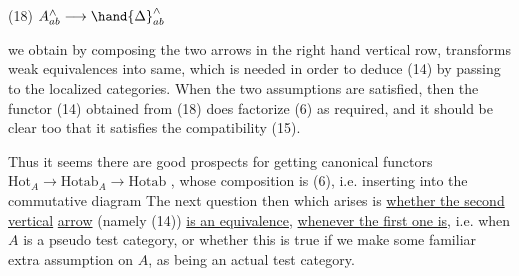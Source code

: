 
(18) \qquad $A^{\wedge}_{ab} \longrightarrow \hand{\Delta}^{\wedge}_{ab}$

we obtain by composing the two arrows in the right hand vertical row,
transforms weak equivalences into same, which is needed in order to
deduce  (14) by passing to the localized categories. When the two
assumptions are satisfied, then the functor (14) obtained from (18)
does factorize (6) as required, and it should be clear too that it
satisfies the compatibility (15).

Thus it seems there are good prospects for getting canonical
functors
 \qquad $\mathrm{Hot}_{A} \longrightarrow \mathrm{Hotab}_{A} \longrightarrow \mathrm{Hotab}$ \quad ,
whose composition is (6), i.e. inserting into the commutative diagram
The next question then which arises is \uline{whether the second vertical}
\uline{arrow} (namely (14)) \uline{is an equivalence}, \uline{whenever the first one is}, i.e.
when $A$ is a pseudo test category, or whether this is true if we make
some familiar extra assumption on $A$,  as being an actual test category.

